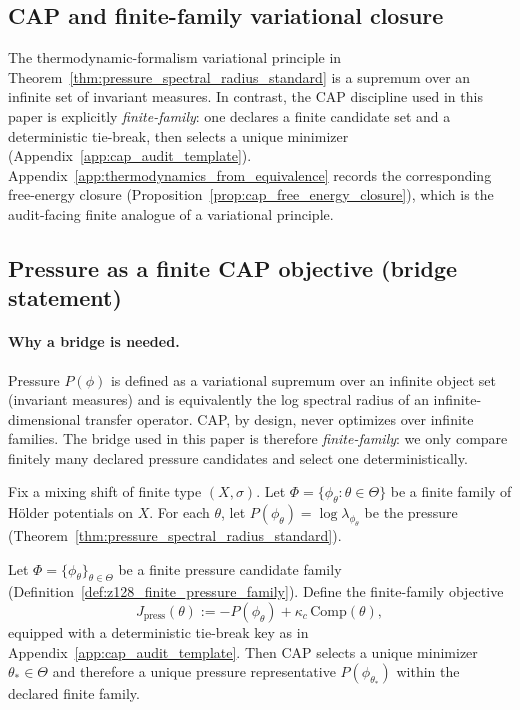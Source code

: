 \subsection{CAP and finite-family variational closure}
\label{subsec:cap_pressure_variational}

\InterfaceTag The thermodynamic-formalism variational principle in Theorem~\ref{thm:pressure_spectral_radius_standard} is a supremum over an infinite set of invariant measures.
In contrast, the CAP discipline used in this paper is explicitly \emph{finite-family}: one declares a finite candidate set and a deterministic tie-break, then selects a unique minimizer (Appendix~\ref{app:cap_audit_template}).
Appendix~\ref{app:thermodynamics_from_equivalence} records the corresponding free-energy closure (Proposition~\ref{prop:cap_free_energy_closure}), which is the audit-facing finite analogue of a variational principle.

\subsection{Pressure as a finite CAP objective (bridge statement)}
\label{subsec:pressure_cap_bridge}

\paragraph{Why a bridge is needed.}
\AuditTag Pressure $P(\phi)$ is defined as a variational supremum over an infinite object set (invariant measures) and is equivalently the log spectral radius of an infinite-dimensional transfer operator.
CAP, by design, never optimizes over infinite families.
The bridge used in this paper is therefore \emph{finite-family}: we only compare finitely many declared pressure candidates and select one deterministically.

\begin{definition}\label{def:z128_finite_pressure_family}
\AuditTag Fix a mixing shift of finite type $(X,\sigma)$.
Let $\Phi=\{\phi_\theta:\theta\in\Theta\}$ be a finite family of H\"older potentials on $X$.
For each $\theta$, let $P(\phi_\theta)=\log\lambda_{\phi_\theta}$ be the pressure (Theorem~\ref{thm:pressure_spectral_radius_standard}).
\end{definition}

\begin{proposition}
\label{prop:z128_pressure_cap_bridge}
\AuditTag Let $\Phi=\{\phi_\theta\}_{\theta\in\Theta}$ be a finite pressure candidate family (Definition~\ref{def:z128_finite_pressure_family}).
Define the finite-family objective
\[
J_{\mathrm{press}}(\theta):=-P(\phi_\theta)+\kappa_c\,\mathrm{Comp}(\theta),
\]
equipped with a deterministic tie-break key as in Appendix~\ref{app:cap_audit_template}.
Then CAP selects a unique minimizer $\theta_\ast\in\Theta$ and therefore a unique pressure representative $P(\phi_{\theta_\ast})$ within the declared finite family.
\end{proposition}

